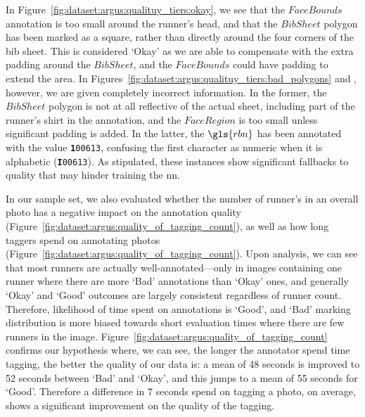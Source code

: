 In Figure~\ref{fig:dataset:argus:qualituy_tiers:okay}, we see that the $FaceBounds$ annotation is too small around the runner's head, and that the $BibSheet$ polygon has been marked as a square, rather than directly around the four corners of the bib sheet. This is considered `Okay' as we are able to compensate with the extra padding around the $BibSheet$, and the $FaceBounds$ could have padding to extend the area. In Figures~\ref{fig:dataset:argus:qualituy_tiers:bad_polygons} and , however, we are given completely incorrect information. In the former, the $BibSheet$ polygon is not at all reflective of the actual sheet, including part of the runner's shirt in the annotation, and the $FaceRegion$ is too small unless significant padding is added. In the latter, the $\gls{rbn}$ has been annotated with the value \texttt{\textbf{1}00613}, confusing the first character as numeric when it is alphabetic (\texttt{\textbf{I}00613}). As stipulated, these instances show significant fallbacks to quality that may hinder training the \gls{nn}.

In our sample set, we also evaluated whether the number of runner's in an overall photo has a negative impact on the annotation quality (Figure~\ref{fig:dataset:argus:quality_of_tagging_count}), as well as how long taggers spend on annotating photos (Figure~\ref{fig:dataset:argus:quality_of_tagging_count}). Upon analysis, we can see that most runners are actually well-annotated---only in images containing one runner where there are more `Bad' annotations than `Okay' ones, and generally `Okay' and `Good' outcomes are largely consistent regardless of runner count. Therefore, likelihood of time spent on annotations is `Good', and `Bad' marking distribution is more biased towards short evaluation times where there are few runners in the image. Figure~\ref{fig:dataset:argus:quality_of_tagging_count} confirms our hypothesis where, we can see, the longer the annotator spend time tagging, the better the quality of our data is: a mean of 48 seconds is improved to 52 seconds between `Bad' and `Okay', and this jumps to a mean of 55 seconds for `Good'. Therefore a difference in 7 seconds spend on tagging a photo, on average, shows a significant improvement on the quality of the tagging.

